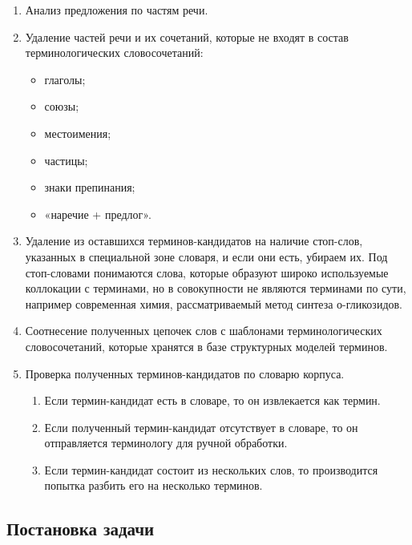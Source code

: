 \begin{enumerate}[label*=\arabic*.]
	\item Анализ предложения по частям речи.
	\item Удаление частей речи и их сочетаний, которые не входят в состав терминологических словосочетаний:
	
	\begin{itemize}[label*=---]
		\item глаголы;
		\item союзы;
		\item местоимения;
		\item частицы;
		\item знаки препинания;
		\item «наречие + предлог».
		
	\end{itemize}
	
	\item Удаление из оставшихся терминов-кандидатов на наличие стоп-слов, указанных в специальной зоне словаря, и если они есть, убираем их. Под стоп-словами понимаются слова, которые образуют широко используемые коллокации с терминами, но в совокупности не являются терминами по сути, например современная химия, рассматриваемый метод синтеза о-гликозидов.
	\item Соотнесение полученных цепочек слов с шаблонами терминологических словосочетаний, которые хранятся в базе структурных моделей терминов.
	\item Проверка полученных терминов-кандидатов по словарю корпуса.
	
	\begin{enumerate}[label*=\arabic*.]
		
	\item Если термин-кандидат есть в словаре, то он извлекается как термин.
	\item Если полученный термин-кандидат отсутствует в словаре, то он отправляется терминологу для ручной обработки.
	\item Если термин-кандидат состоит из нескольких слов, то производится попытка разбить его на несколько терминов.
	
	\end{enumerate}
	
\end{enumerate}



\subsection{Постановка задачи}

